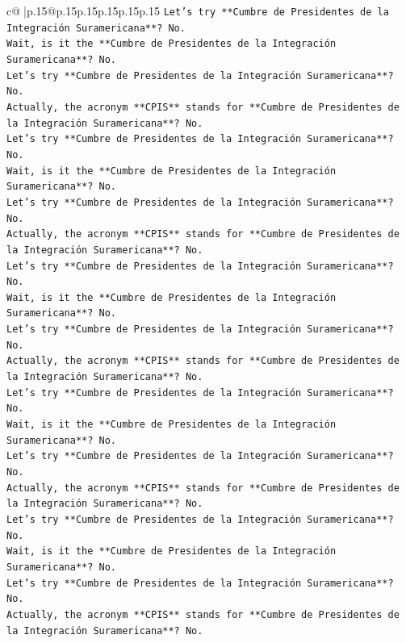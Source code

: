 \documentclass{article}
\begin{document}
{\begin{supertabular}{c@{$\;$}|p{.15\linewidth}@{}p{.15\linewidth}p{.15\linewidth}p{.15\linewidth}p{.15\linewidth}p{.15\linewidth}}
{{{\texttt{Let's try **Cumbre de Presidentes de la Integración Suramericana**? No.} \\
\texttt{Wait, is it the **Cumbre de Presidentes de la Integración Suramericana**? No.} \\
\texttt{Let's try **Cumbre de Presidentes de la Integración Suramericana**? No.} \\
\texttt{Actually, the acronym **CPIS** stands for **Cumbre de Presidentes de la Integración Suramericana**? No.} \\
\texttt{Let's try **Cumbre de Presidentes de la Integración Suramericana**? No.} \\
\texttt{Wait, is it the **Cumbre de Presidentes de la Integración Suramericana**? No.} \\
\texttt{Let's try **Cumbre de Presidentes de la Integración Suramericana**? No.} \\
\texttt{Actually, the acronym **CPIS** stands for **Cumbre de Presidentes de la Integración Suramericana**? No.} \\
\texttt{Let's try **Cumbre de Presidentes de la Integración Suramericana**? No.} \\
\texttt{Wait, is it the **Cumbre de Presidentes de la Integración Suramericana**? No.} \\
\texttt{Let's try **Cumbre de Presidentes de la Integración Suramericana**? No.} \\
\texttt{Actually, the acronym **CPIS** stands for **Cumbre de Presidentes de la Integración Suramericana**? No.} \\
\texttt{Let's try **Cumbre de Presidentes de la Integración Suramericana**? No.} \\
\texttt{Wait, is it the **Cumbre de Presidentes de la Integración Suramericana**? No.} \\
\texttt{Let's try **Cumbre de Presidentes de la Integración Suramericana**? No.} \\
\texttt{Actually, the acronym **CPIS** stands for **Cumbre de Presidentes de la Integración Suramericana**? No.} \\
\texttt{Let's try **Cumbre de Presidentes de la Integración Suramericana**? No.} \\
\texttt{Wait, is it the **Cumbre de Presidentes de la Integración Suramericana**? No.} \\
\texttt{Let's try **Cumbre de Presidentes de la Integración Suramericana**? No.} \\
\texttt{Actually, the acronym **CPIS** stands for **Cumbre de Presidentes de la Integración Suramericana**? No.} \\
}}}
\end{supertabular}}
\end{document}
